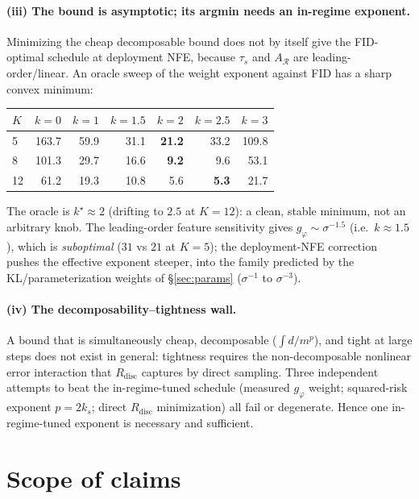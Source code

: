 \documentclass[11pt]{article}
\newcommand{\R}{\mathcal R}
\begin{document}
\paragraph{(iii) The bound is asymptotic; its argmin needs an in-regime
exponent.} Minimizing the cheap decomposable bound does not by itself give
the FID-optimal schedule at deployment NFE, because $\tau_s$ and $A_\R$
are leading-order/linear. An oracle sweep of the weight exponent against
FID has a sharp convex minimum:
\begin{center}
\small
\begin{tabular}{l rrrrrr}
\toprule
$K$ & $k{=}0$ & $k{=}1$ & $k{=}1.5$ & $k{=}2$ & $k{=}2.5$ & $k{=}3$ \\
\midrule
5 & 163.7 & 59.9 & 31.1 & \textbf{21.2} & 33.2 & 109.8 \\
8 & 101.3 & 29.7 & 16.6 & \textbf{9.2} & 9.6 & 53.1 \\
12 & 61.2 & 19.3 & 10.8 & 5.6 & \textbf{5.3} & 21.7 \\
\bottomrule
\end{tabular}
\end{center}
The oracle is $k^\star\approx 2$ (drifting to $2.5$ at $K{=}12$): a clean,
stable minimum, not an arbitrary knob. The leading-order feature
sensitivity gives $g_\varphi\sim\sigma^{-1.5}$ (i.e.\ $k\approx1.5$), which
is \emph{suboptimal} ($31$ vs $21$ at $K{=}5$); the deployment-NFE
correction pushes the effective exponent steeper, into the family
predicted by the KL/parameterization weights of \S\ref{sec:params}
($\sigma^{-1}$ to $\sigma^{-3}$).

\paragraph{(iv) The decomposability--tightness wall.} A bound that is
simultaneously cheap, decomposable ($\int d/m^p$), and tight at large
steps does not exist in general: tightness requires the non-decomposable
nonlinear error interaction that $R_{\mathrm{disc}}$ captures by direct
sampling. Three independent attempts to beat the in-regime-tuned schedule
(measured $g_\varphi$ weight; squared-risk exponent $p=2k_s$; direct
$R_{\mathrm{disc}}$ minimization) all fail or degenerate. Hence one
in-regime-tuned exponent is necessary and sufficient.

\section{Scope of claims}
\label{sec:scope}
\end{document}
